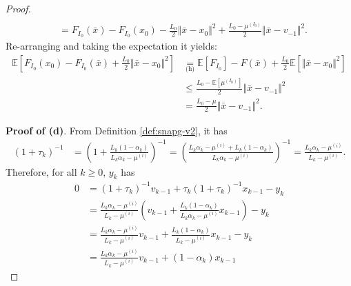 \documentclass[12pt]{article}
\begin{document}
\begin{proof}
\begin{align*}
                \\
                &= F_{I_0}(\bar x) - F_{I_0}(x_0) - \frac{L_0}{2}\Vert \bar x - x_0\Vert^2 + \frac{L_0 - \mu^{(I_0)}}{2}\Vert \bar x - v_{-1}\Vert^2. 
            \end{align*}
            Re-arranging and taking the expectation it yields: 
            \begin{align*}
                \mathbb E \left[
                    F_{I_0}(x_0) - F_{I_0}(\bar x) + \frac{L_0}{2}\Vert \bar x - x_0\Vert^2
                \right]
                &\underset{\text{(h)}}{=}
                \mathbb E \left[ F_{I_0}\right] - F(\bar x) 
                + \frac{L_0}{2}\mathbb E \left[\Vert \bar x - x_0\Vert^2\right]
                \\
                &\le \frac{L_0 - \mathbb E \left[\mu^{(I_0)}\right]}{2}\Vert \bar x - v_{-1}\Vert^2
                \\
                &= \frac{L_0 - \mu}{2}\Vert \bar x - v_{-1}\Vert^2. 
            \end{align*}
            \par
            \textbf{Proof of (d)}.
            From Definition \ref{def:snapg-v2}, it has
            \begin{align*}
                (1 + \tau_k)^{-1}
                &=
                \left(
                    1 + \frac{L_k(1 - \alpha_k)}{L_k\alpha_k - \mu^{(i)}}
                \right)^{-1} = \left(
                    \frac{L_k\alpha_k - \mu^{(i)} + L_k(1 - \alpha_k)}{L_k\alpha_k - \mu^{(i)}}
                \right)^{-1}
                = \frac{L_k\alpha_k - \mu^{(i)}}{L_k - \mu^{(i)}}. 
            \end{align*}
            Therefore, for all $k \ge 0$, $y_k$ has 
            \begin{align*}
                0 &= (1 + \tau_k)^{-1} v_{k - 1} + \tau_k (1 + \tau_k)^{-1} x_{k - 1} - y_k
                \\
                &= \frac{L_k\alpha_k - \mu^{(i)}}{L_k - \mu^{(i)}} 
                \left(
                    v_{k - 1} + \frac{L_k(1 - \alpha_k)}{L_k\alpha_k - \mu^{(i)}} x_{k - 1}
                \right) - y_k
                \\
                &= \frac{L_k\alpha_k - \mu^{(i)}}{L_k - \mu^{(i)}} v_{k - 1}
                + \frac{L_k(1 - \alpha_k)}{L_k - \mu^{(i)}} x_{k - 1} - y_k
                \\
                &= \frac{L_k\alpha_k - \mu^{(i)}}{L_k - \mu^{(i)}} v_{k - 1} + (1 - \alpha_k)x_{k - 1}

\end{align*}
\end{proof}
\end{document}
